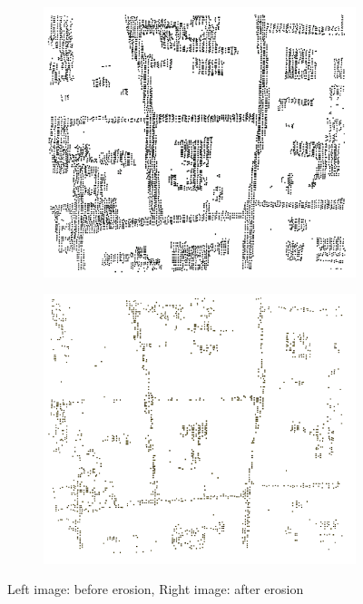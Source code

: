 \documentclass[11pt]{article}
\begin{document}
    \begin{figure}
        \centering
        \begin{subfigure}{0.45\textwidth}
            \centering
            \includegraphics[width=\linewidth]{images/experiment/ply_erosion_0}
        \end{subfigure}
        \hfill
        \begin{subfigure}{0.45\textwidth}
            \centering
            \includegraphics[width=\linewidth]{images/experiment/ply_erosion_1}
        \end{subfigure}
        \caption{Left image: before erosion, Right image: after erosion}
        \label{fig:ply_erosion}
    \end{figure}
\end{document}
